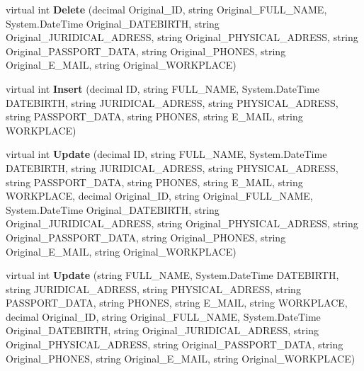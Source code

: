 \begin{CompactItemize}
\item 
virtual int \textbf{Delete} (decimal Original\_\-ID, string Original\_\-FULL\_\-NAME, System.DateTime Original\_\-DATEBIRTH, string Original\_\-JURIDICAL\_\-ADRESS, string Original\_\-PHYSICAL\_\-ADRESS, string Original\_\-PASSPORT\_\-DATA, string Original\_\-PHONES, string Original\_\-E\_\-MAIL, string Original\_\-WORKPLACE)\label{class_automatic_medical_system_1_1_data_set1_table_adapters_1_1_p_a_t_i_e_n_t_s_table_adapter_f4100edf08f39323dc61a192e43033b2}

\item 
virtual int \textbf{Insert} (decimal ID, string FULL\_\-NAME, System.DateTime DATEBIRTH, string JURIDICAL\_\-ADRESS, string PHYSICAL\_\-ADRESS, string PASSPORT\_\-DATA, string PHONES, string E\_\-MAIL, string WORKPLACE)\label{class_automatic_medical_system_1_1_data_set1_table_adapters_1_1_p_a_t_i_e_n_t_s_table_adapter_2b297c0eae47145b160711b0d37714d5}

\item 
virtual int \textbf{Update} (decimal ID, string FULL\_\-NAME, System.DateTime DATEBIRTH, string JURIDICAL\_\-ADRESS, string PHYSICAL\_\-ADRESS, string PASSPORT\_\-DATA, string PHONES, string E\_\-MAIL, string WORKPLACE, decimal Original\_\-ID, string Original\_\-FULL\_\-NAME, System.DateTime Original\_\-DATEBIRTH, string Original\_\-JURIDICAL\_\-ADRESS, string Original\_\-PHYSICAL\_\-ADRESS, string Original\_\-PASSPORT\_\-DATA, string Original\_\-PHONES, string Original\_\-E\_\-MAIL, string Original\_\-WORKPLACE)\label{class_automatic_medical_system_1_1_data_set1_table_adapters_1_1_p_a_t_i_e_n_t_s_table_adapter_4c95c54bf1a88824191b5365a88551b7}

\item 
virtual int \textbf{Update} (string FULL\_\-NAME, System.DateTime DATEBIRTH, string JURIDICAL\_\-ADRESS, string PHYSICAL\_\-ADRESS, string PASSPORT\_\-DATA, string PHONES, string E\_\-MAIL, string WORKPLACE, decimal Original\_\-ID, string Original\_\-FULL\_\-NAME, System.DateTime Original\_\-DATEBIRTH, string Original\_\-JURIDICAL\_\-ADRESS, string Original\_\-PHYSICAL\_\-ADRESS, string Original\_\-PASSPORT\_\-DATA, string Original\_\-PHONES, string Original\_\-E\_\-MAIL, string Original\_\-WORKPLACE)\label{class_automatic_medical_system_1_1_data_set1_table_adapters_1_1_p_a_t_i_e_n_t_s_table_adapter_ee1168261dad5d1a9b5617d2b2dc1e86}

\end{CompactItemize}

